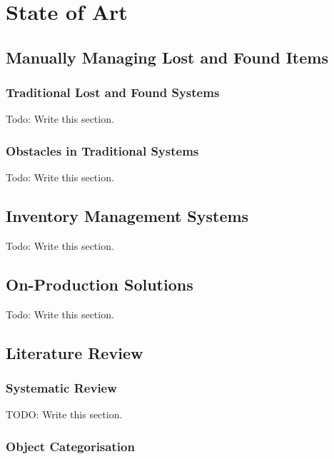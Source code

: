 
\chapter{State of Art}
\label{chapter:state_of_art}

\section{Manually Managing Lost and Found Items}

\subsection{Traditional Lost and Found Systems}

Todo: Write this section.

\subsection{Obstacles in Traditional Systems}

Todo: Write this section.



\section{Inventory Management Systems}

Todo: Write this section.



\section{On-Production Solutions}

Todo: Write this section.



\section{Literature Review}

\subsection{Systematic Review}

TODO: Write this section.

\subsection{Object Categorisation}

